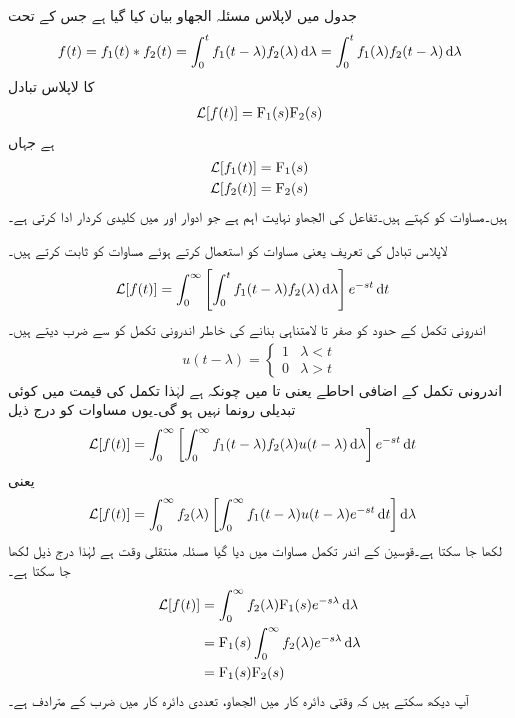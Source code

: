 جدول  میں لاپلاس مسئلہ الجھاو بیان کیا گیا ہے جس کے تحت 
\begin{align}\label{مساوات_لاپلاس_الجھاو_تعریف}
f(t)=f_1(t) \ast f_2(t)=\int_0^t f_1(t-\lambda)f_2(\lambda)\dif \lambda=\int_0^t f_1(\lambda)f_2(t-\lambda)\dif \lambda
\end{align}
کا لاپلاس تبادل
\begin{align}\label{مساوات_لاپلاس_مسئلہ_الجھاو_تعریف}
\mathcal{L}[f(t)]={{\textup{F}}}_1(s){{\textup{F}}}_2(s)
\end{align}
ہے جہاں
\begin{align*}
\mathcal{L}[f_1(t)]&={{\textup{F}}}_1(s)\\
\mathcal{L}[f_2(t)]&={{\textup{F}}}_2(s)
\end{align*}
 ہیں۔مساوات  کو  کہتے ہیں۔تفاعل کی الجھاو نہایت اہم ہے جو ادوار اور   میں کلیدی کردار ادا کرتی ہے۔

لاپلاس تبادل کی تعریف یعنی مساوات  کو استعمال کرتے ہوئے مساوات  کو ثابت کرتے ہیں۔
\begin{align}\label{مساوات_لاپلاس_الجھاو_الف}
\Laplace[f(t)]&=\int_0^{\infty}\left[\int_0^t f_1(t-\lambda)f_2(\lambda) \dif \lambda\right]e^{-st}\dif t
\end{align}
اندرونی تکمل کے حدود کو صفر تا لامتناہی بنانے کی خاطر اندرونی تکمل کو  سے ضرب دیتے ہیں۔
\begin{align*}
u(t-\lambda)=
\begin{cases}
1& \lambda<t\\
0&\lambda>t
\end{cases}
\end{align*}
اندرونی تکمل کے اضافی احاطے یعنی  تا  میں چونکہ  ہے لہٰذا تکمل کی قیمت میں کوئی تبدیلی رونما نہیں ہو گی۔یوں مساوات  کو درج ذیل
\begin{align*}
\Laplace[f(t)]&=\int_0^{\infty}\left[\int_0^{\infty} f_1(t-\lambda)f_2(\lambda) u(t-\lambda) \dif \lambda\right]e^{-st}\dif t
\end{align*}
یعنی
\begin{align*}
\Laplace[f(t)]&=\int_0^{\infty}f_2(\lambda)\left[\int_0^{\infty} f_1(t-\lambda) u(t-\lambda) e^{-st}\dif t\right]\dif \lambda
\end{align*}
لکھا جا سکتا ہے۔قوسین کے اندر تکمل مساوات  میں دیا گیا مسئلہ منتقلی وقت ہے لہٰذا درج ذیل لکھا جا سکتا ہے۔
 \begin{align*}
\Laplace[f(t)]&=\int_0^{\infty}f_2(\lambda)\bF_1(s)e^{-s \lambda}\dif \lambda\\
&=\bF_1(s)\int_0^{\infty} f_2(\lambda) e^{-s\lambda} \dif \lambda\\
&=\bF_1(s) \bF_2(s)
\end{align*}
آپ دیکھ سکتے ہیں کہ وقتی دائرہ کار میں الجھاو، تعددی دائرہ کار میں ضرب کے مترادف ہے۔

